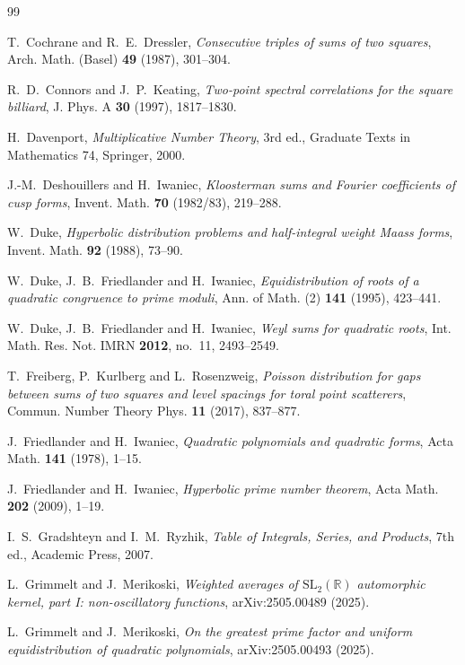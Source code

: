 \documentclass[11pt]{amsart}
\theoremstyle{remark}
\theoremstyle{definition}
\numberwithin{equation}{section}
\begin{document}
\begin{thebibliography}{99}

 T.~Cochrane and R.~E.~Dressler, \emph{Consecutive triples of sums of two squares}, Arch. Math. (Basel) \textbf{49} (1987), 301--304.

 R.~D.~Connors and J.~P.~Keating, \emph{Two-point spectral correlations for the square billiard}, J. Phys. A \textbf{30} (1997), 1817--1830.

 H.~Davenport, \emph{Multiplicative Number Theory}, 3rd ed., Graduate Texts in Mathematics 74, Springer, 2000.

 J.-M.~Deshouillers and H.~Iwaniec, \emph{Kloosterman sums and Fourier coefficients of cusp forms}, Invent. Math. \textbf{70} (1982/83), 219--288.

 W.~Duke, \emph{Hyperbolic distribution problems and half-integral weight Maass forms}, Invent. Math. \textbf{92} (1988), 73--90.

 W.~Duke, J.~B.~Friedlander and H.~Iwaniec, \emph{Equidistribution of roots of a quadratic congruence to prime moduli}, Ann. of Math. (2) \textbf{141} (1995), 423--441.

 W.~Duke, J.~B.~Friedlander and H.~Iwaniec, \emph{Weyl sums for quadratic roots}, Int. Math. Res. Not. IMRN \textbf{2012}, no.~11, 2493--2549.

 T.~Freiberg, P.~Kurlberg and L.~Rosenzweig, \emph{Poisson distribution for gaps between sums of two squares and level spacings for toral point scatterers}, Commun. Number Theory Phys. \textbf{11} (2017), 837--877.

 J.~Friedlander and H.~Iwaniec, \emph{Quadratic polynomials and quadratic forms}, Acta Math. \textbf{141} (1978), 1--15.

 J.~Friedlander and H.~Iwaniec, \emph{Hyperbolic prime number theorem}, Acta Math. \textbf{202} (2009), 1--19.

 I.~S.~Gradshteyn and I.~M.~Ryzhik, \emph{Table of Integrals, Series, and Products}, 7th ed., Academic Press, 2007.

 L.~Grimmelt and J.~Merikoski, \emph{Weighted averages of $\mathrm{SL}_2(\mathbb R)$ automorphic kernel, part I: non-oscillatory functions}, arXiv:2505.00489 (2025).

 L.~Grimmelt and J.~Merikoski, \emph{On the greatest prime factor and uniform equidistribution of quadratic polynomials}, arXiv:2505.00493 (2025).


\end{thebibliography}
\end{document}
